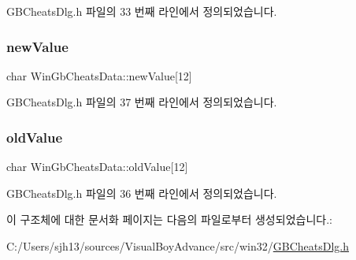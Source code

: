 G\+B\+Cheats\+Dlg.\+h 파일의 33 번째 라인에서 정의되었습니다.

\mbox{\label{struct_win_gb_cheats_data_a6fc49b4d1e4bb935624c98a337091eb9}} 
\subsubsection{\texorpdfstring{new\+Value}{newValue}}
{\footnotesize\ttfamily char Win\+Gb\+Cheats\+Data\+::new\+Value\mbox{[}12\mbox{]}}



G\+B\+Cheats\+Dlg.\+h 파일의 37 번째 라인에서 정의되었습니다.

\mbox{\label{struct_win_gb_cheats_data_abe8e108df6ab1b40209bdc2e3e490c8a}} 
\subsubsection{\texorpdfstring{old\+Value}{oldValue}}
{\footnotesize\ttfamily char Win\+Gb\+Cheats\+Data\+::old\+Value\mbox{[}12\mbox{]}}



G\+B\+Cheats\+Dlg.\+h 파일의 36 번째 라인에서 정의되었습니다.



이 구조체에 대한 문서화 페이지는 다음의 파일로부터 생성되었습니다.\+:\begin{DoxyCompactItemize}
\item 
C\+:/\+Users/sjh13/sources/\+Visual\+Boy\+Advance/src/win32/\mbox{\hyperlink{_g_b_cheats_dlg_8h}{G\+B\+Cheats\+Dlg.\+h}}\end{DoxyCompactItemize}
